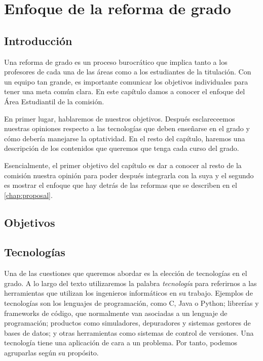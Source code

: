 \chapter{Enfoque de la reforma de grado}\label{chap:approach}

\section{Introducción}


Una reforma de grado es un proceso burocrático que implica tanto a los
profesores de cada una de las áreas como a los estudiantes de la titulación.
Con un equipo tan grande,
es importante comunicar los objetivos individuales para
tener una meta común clara.
En este capítulo damos a conocer el enfoque del Área Estudiantil de la comisión.


En primer lugar, hablaremos de nuestros objetivos.
Después esclareceemos nuestras opiniones respecto a
las tecnologías que deben enseñarse en el grado y
cómo debería manejarse la optatividad.
En el resto del capítulo,
haremos una descripción de
los contenidos que queremos que tenga cada curso del grado.


Esencialmente, el primer objetivo del capítulo es
dar a conocer al resto de la comisión nuestra opinión
para poder después integrarla con la suya y
el segundo es mostrar el enfoque que
hay detrás de las reformas que se describen en el \cref{chap:proposal}.

\section{Objetivos}

\section{Tecnologías}

Una de las cuestiones que queremos abordar es
la elección de tecnologías en el grado.
A lo largo del texto utilizaremos la palabra \emph{tecnología} para referirnos a
las herramientas que utilizan los ingenieros informáticos en su trabajo.
Ejemplos de tecnologías son
los lenguajes de programación,
como C, Java o Python;
librerías y frameworks de código,
que normalmente van asociadas a un lenguaje de programación;
productos como simuladores, depuradores y sistemas gestores de bases de datos; y
otras herramientas como sistemas de control de versiones.
Una tecnología tiene una aplicación de cara a un problema.
Por tanto, podemos agruparlas según su propósito.


